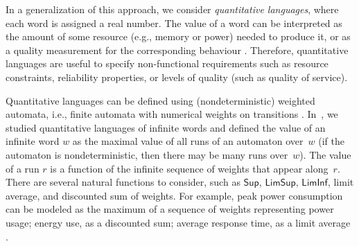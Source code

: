 \documentclass{llncs}
\newcommand{\Max}{\mathsf{Sup}}
\newcommand{\LimSup}{\mathsf{LimSup}}
\newcommand{\LimInf}{\mathsf{LimInf}}
\begin{document}
In a generalization of this approach, we consider \emph{quantitative
languages}, where each word is assigned a real number.  The value of a
word can be interpreted as the amount of some resource (e.g., memory
or power) needed to produce it, or as a quality measurement for the
corresponding behaviour \cite{CAHS03,CAFH+06}.
Therefore, quantitative languages are useful to specify non-functional
requirements such as resource constraints, reliability properties, or
levels of quality (such as quality of service).

Quantitative languages can be defined using (nondeterministic)
weighted automata, i.e., finite automata with numerical weights on
transitions \cite{CulikK94,EsikK04}.  In~\cite{CDH08a}, we studied
quantitative languages of infinite words and defined the value of an
infinite word $w$ as the maximal value of all runs of an automaton
over~$w$ (if the automaton is nondeterministic, then there may be many
runs over~$w$).  The value of a run $r$ is a function of the infinite
sequence of weights that appear along~$r$.  There are several natural
functions to consider, such as $\Max$, $\LimSup$,
$\LimInf$, limit average, and discounted sum of weights.  For example,
peak power consumption can be modeled as the maximum of a sequence of
weights representing power usage; energy use, as a discounted sum;
average response time, as a limit average \cite{CCHK+05,CAHS03}.
\end{document}
